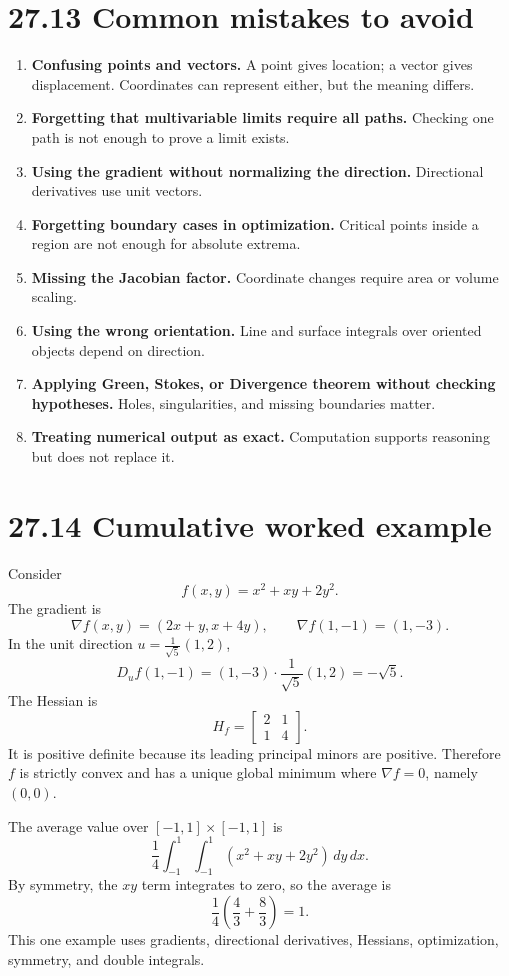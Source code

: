 \documentclass[11pt]{article}
\newcommand{\grad}{\nabla}
\begin{document}
\section*{27.13 Common mistakes to avoid}

\begin{enumerate}
  \item \textbf{Confusing points and vectors.} A point gives location; a vector gives displacement. Coordinates can represent either, but the meaning differs.
  \item \textbf{Forgetting that multivariable limits require all paths.} Checking one path is not enough to prove a limit exists.
  \item \textbf{Using the gradient without normalizing the direction.} Directional derivatives use unit vectors.
  \item \textbf{Forgetting boundary cases in optimization.} Critical points inside a region are not enough for absolute extrema.
  \item \textbf{Missing the Jacobian factor.} Coordinate changes require area or volume scaling.
  \item \textbf{Using the wrong orientation.} Line and surface integrals over oriented objects depend on direction.
  \item \textbf{Applying Green, Stokes, or Divergence theorem without checking hypotheses.} Holes, singularities, and missing boundaries matter.
  \item \textbf{Treating numerical output as exact.} Computation supports reasoning but does not replace it.
\end{enumerate}

\section*{27.14 Cumulative worked example}

\begin{examplebox}
Consider
\[
f(x,y)=x^2+xy+2y^2.
\]
The gradient is
\[
\grad f(x,y)=(2x+y,x+4y),
\qquad
\grad f(1,-1)=(1,-3).
\]
In the unit direction $u=\frac{1}{\sqrt5}(1,2)$,
\[
D_u f(1,-1)=(1,-3)\cdot\frac{1}{\sqrt5}(1,2)=-\sqrt5.
\]
The Hessian is
\[
H_f=\begin{bmatrix}2&1\\1&4\end{bmatrix}.
\]
It is positive definite because its leading principal minors are positive. Therefore $f$ is strictly convex and has a unique global minimum where $\grad f=0$, namely $(0,0)$.

The average value over $[-1,1]\times[-1,1]$ is
\[
\frac{1}{4}\int_{-1}^1\int_{-1}^1(x^2+xy+2y^2)\,dy\,dx.
\]
By symmetry, the $xy$ term integrates to zero, so the average is
\[
\frac14\left(\frac43+\frac83\right)=1.
\]
This one example uses gradients, directional derivatives, Hessians, optimization, symmetry, and double integrals.
\end{examplebox}
\end{document}

